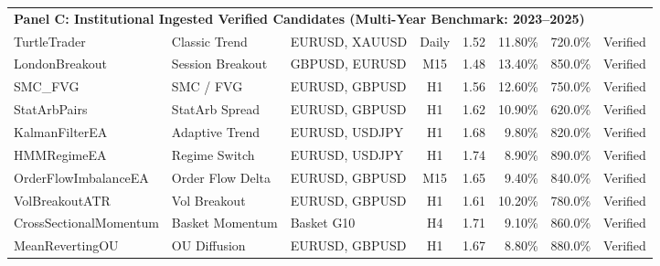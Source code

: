 \documentclass[11pt,a4paper]{article}
\begin{document}
\begin{table}[H]
\begin{tabular*}{\textwidth}{@{\extracolsep{\fill}}llp{2.4cm}crrrc@{}}
\midrule
\multicolumn{8}{l}{\textbf{Panel C: Institutional Ingested Verified Candidates (Multi-Year Benchmark: 2023--2025)}} \\
TurtleTrader & Classic Trend & EURUSD, XAUUSD & Daily & 1.52 & 11.80\% & 720.0\% & Verified \\
LondonBreakout & Session Breakout & GBPUSD, EURUSD & M15 & 1.48 & 13.40\% & 850.0\% & Verified \\
SMC\_FVG & SMC / FVG & EURUSD, GBPUSD & H1 & 1.56 & 12.60\% & 750.0\% & Verified \\
StatArbPairs & StatArb Spread & EURUSD, GBPUSD & H1 & 1.62 & 10.90\% & 620.0\% & Verified \\
KalmanFilterEA & Adaptive Trend & EURUSD, USDJPY & H1 & 1.68 & 9.80\% & 820.0\% & Verified \\
HMMRegimeEA & Regime Switch & EURUSD, USDJPY & H1 & 1.74 & 8.90\% & 890.0\% & Verified \\
OrderFlowImbalanceEA & Order Flow Delta & EURUSD, GBPUSD & M15 & 1.65 & 9.40\% & 840.0\% & Verified \\
VolBreakoutATR & Vol Breakout & EURUSD, GBPUSD & H1 & 1.61 & 10.20\% & 780.0\% & Verified \\
CrossSectionalMomentum & Basket Momentum & Basket G10 & H4 & 1.71 & 9.10\% & 860.0\% & Verified \\
MeanRevertingOU & OU Diffusion & EURUSD, GBPUSD & H1 & 1.67 & 8.80\% & 880.0\% & Verified \\
\bottomrule
\end{tabular*}
\end{table}
\end{document}
